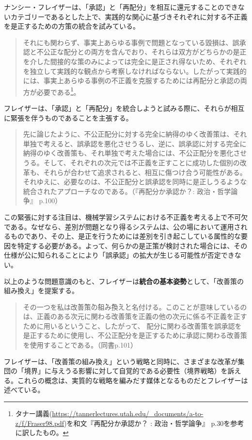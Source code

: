 \documentclass[b5j,twoside,twocolumn]{utarticle}
\begin{document}
ナンシー・フレイザーは、「承認」と「再配分」を相互に還元することのできないカテゴリーであるとした上で、実践的な関心に基づきそれぞれに対する不正義を是正するための方策の統合を試みている。
\begin{quote}
それにも関わらず、事実上あらゆる事例で問題となっている毀損は、誤承認と不公正な配分との両方を含んでおり、それらは双方がどちらかの是正を介した間接的な策のみによっては完全に是正され得ないため、それぞれを独立して実践的な観点から考察しなければならない。したがって実践的には、事実上あらゆる事例の不正義を克服するためには再配分と承認の両方が必要である\footnote{タナー講義(\url{https://tannerlectures.utah.edu/_documents/a-to-z/f/Fraser98.pdf})を和文\cite{BB10510230}『再配分か承認か？ : 政治・哲学論争』 p.30を参考に訳したもの。}。
\end{quote}
フレイザーは、「承認」と「再配分」を統合しようと試みる際に、それらが相互に緊張を伴うものであることを主張する。
\begin{quote}
先に論じたように、不公正配分に対する完全に納得のゆく改善策は、それ単独で考えると、誤承認を悪化させうるし、逆に、誤承認に対する完全に納得のゆく改善策も、それ単独で考えた場合には、不公正配分を悪化させうる。そして、それぞれの次元では不正義を正すことに成功した個別の改革も、それらが合わせて追求されると、相互に傷つけ合う可能性がある。それゆえに、必要なのは、不公正配分と誤承認を同時に是正しうるような統合されたアプローチなのである。（\cite{BB10510230}『再配分か承認か？: 政治・哲学論争』 p.100）
\end{quote}

この緊張に対する注目は、機械学習システムにおける不正義を考える上で不可欠である。なぜなら、差別が問題となり得るシステムは、公の場において運用されるものであり、その上、是正を行うためには差別を引き起こしている属性的な要因を特定する必要がある。よって、何らかの是正策が検討された場合には、その仕様が公に知られることにより「誤承認」の拡大が生じる可能性が否定できない。


以上のような問題意識のもと、フレイザーは\textbf{統合の基本姿勢}として、「改善策の組み換え」を提案する。
\begin{quote}
その一つを私は\.改\.善\.策\.の\.組\.み\.換\.えと名付ける。このことが意味しているのは、正義のある次元に関わる改善策を正義の他の次元に係る不正義を正すために用いるということ、したがって、
配分に関わる改善策を誤承認を是正するために使用し、不公正配分を是正するために承認に関わる改善策を使用することである。（同書p.101）
\end{quote}
フレイザーは、「改善策の組み換え」という戦略と同時に、さまざまな改革が集団の「境界」に与えうる影響に対して自覚的である必要性（境界戦略）を訴える。これらの概念は、実質的な戦略を編みだす媒体となるものだとフレイザーは述べている。
\end{document}
